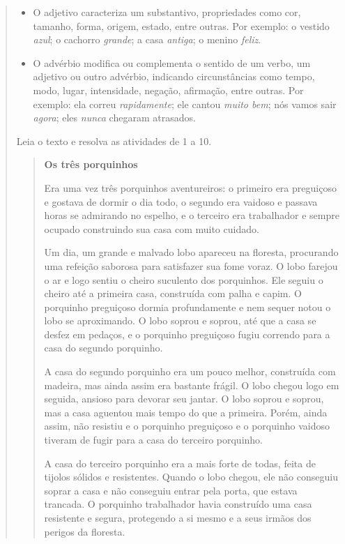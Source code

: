 \begin{quote}
{\begin{itemize}
\item
  O adjetivo caracteriza um substantivo,
  propriedades como cor, tamanho, forma, origem,
  estado, entre outras. Por exemplo: o vestido \textit{azul}; o cachorro
  \textit{grande}; a casa \textit{antiga}; o menino \textit{feliz}.
\item
  O advérbio modifica ou complementa o sentido de um verbo, um adjetivo ou
  outro advérbio, indicando circunstâncias como tempo, modo, lugar,
  intensidade, negação, afirmação, entre outras. Por exemplo: ela
  correu \textit{rapidamente}; ele cantou \textit{muito bem}; nós vamos sair \textit{agora};
  eles \textit{nunca} chegaram atrasados.
\end{itemize}
}


Leia o texto e resolva as atividades de 1 a 10.

\begin{quote}
\textbf{Os três porquinhos}

Era uma vez três porquinhos aventureiros: o primeiro era preguiçoso e
gostava de dormir o dia todo, o segundo era vaidoso e passava horas se
admirando no espelho, e o terceiro era trabalhador e sempre ocupado
construindo sua casa com muito cuidado.

Um dia, um grande e malvado lobo apareceu na floresta, procurando uma
refeição saborosa para satisfazer sua fome voraz. O lobo farejou o ar e
logo sentiu o cheiro suculento dos porquinhos. Ele seguiu o cheiro até a
primeira casa, construída com palha e capim. O porquinho preguiçoso
dormia profundamente e nem sequer notou o lobo se aproximando. O lobo
soprou e soprou, até que a casa se desfez em pedaços, e o porquinho
preguiçoso fugiu correndo para a casa do segundo porquinho.

A casa do segundo porquinho era um pouco melhor, construída com madeira,
mas ainda assim era bastante frágil. O lobo chegou logo em seguida,
ansioso para devorar seu jantar. O lobo soprou e soprou, mas a casa
aguentou mais tempo do que a primeira. Porém, ainda assim, não resistiu e
o porquinho preguiçoso e o porquinho vaidoso tiveram de fugir para a casa
do terceiro porquinho.

A casa do terceiro porquinho era a mais forte de todas, feita de tijolos
sólidos e resistentes. Quando o lobo chegou, ele não conseguiu soprar a
casa e não conseguiu entrar pela porta, que estava trancada. O porquinho
trabalhador havia construído uma casa resistente e segura, protegendo a
si mesmo e a seus irmãos dos perigos da floresta.


\end{quote}
\end{quote}
